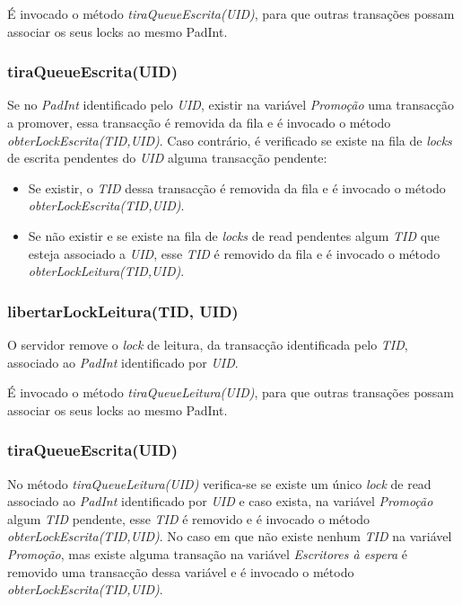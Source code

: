 É invocado o método \textit{tiraQueueEscrita(UID)}, para que outras transações possam associar os seus locks ao mesmo PadInt.

\subsubsection{tiraQueueEscrita(UID)}

Se no \textit{PadInt} identificado pelo \textit{UID}, existir na variável \textit{Promoção} uma transacção a promover, essa transacção é removida da fila e é invocado o método \textit{obterLockEscrita(TID,UID)}. Caso contrário, é verificado se existe na fila de \textit{locks} de escrita pendentes do \textit{UID} alguma transacção pendente:
\begin{itemize}
	\item Se existir, o \textit{TID} dessa transacção é removida da fila e é invocado o método \textit{obterLockEscrita(TID,UID)}. 
	\item Se não existir e se existe na fila de \textit{locks} de read pendentes algum \textit{TID}  que esteja associado a \textit{UID}, esse \textit{TID} é removido da fila e é invocado o método \textit{obterLockLeitura(TID,UID)}.
\end{itemize}

\subsubsection{libertarLockLeitura(TID, UID)}

O servidor remove o \textit{lock} de leitura, da transacção identificada pelo \textit{TID}, associado ao \textit{PadInt} identificado por \textit{UID}.

É invocado o método \textit{tiraQueueLeitura(UID)}, para que outras transações possam associar os seus locks ao mesmo PadInt.

\subsubsection{tiraQueueEscrita(UID)}

No método \textit{tiraQueueLeitura(UID)} verifica-se se existe um único \textit{lock} de read associado ao \textit{PadInt} identificado por \textit{UID} e caso exista, na variável \textit{Promoção} algum \textit{TID} pendente, esse \textit{TID} é removido e é invocado o método \textit{obterLockEscrita(TID,UID)}. No caso em que não existe nenhum \textit{TID} na variável \textit{Promoção}, mas existe alguma transação na variável \textit{Escritores à espera} é removido uma transacção dessa variável e é invocado o método \textit{obterLockEscrita(TID,UID)}.

